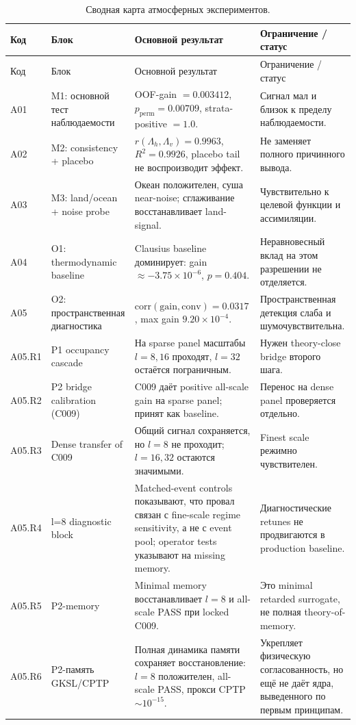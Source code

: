 \documentclass[11pt,a4paper]{article}
\theoremstyle{definition}
\theoremstyle{plain}
\theoremstyle{remark}
\begin{document}
{\small
\begin{longtable}{@{}p{1.3cm}p{3.3cm}p{5.0cm}p{3.6cm}@{}}
\caption{Сводная карта атмосферных экспериментов.}\label{tab:appendix_a_map}\\
\toprule
Код & Блок & Основной результат & Ограничение / статус \\
\midrule
\endfirsthead
\toprule
Код & Блок & Основной результат & Ограничение / статус \\
\midrule
\endhead
A01 & M1: основной тест наблюдаемости & OOF-gain $=0.003412$, $p_{\mathrm{perm}}=0.00709$, strata-positive $=1.0$. & Сигнал мал и близок к пределу наблюдаемости. \\
A02 & M2: consistency + placebo & $r(\Lambda_h,\Lambda_v)=0.9963$, $R^2=0.9926$, placebo tail не воспроизводит эффект. & Не заменяет полного причинного вывода. \\
A03 & M3: land/ocean + noise probe & Океан положителен, суша near-noise; сглаживание восстанавливает land-signal. & Чувствительно к целевой функции и ассимиляции. \\
A04 & O1: thermodynamic baseline & Clausius baseline доминирует: gain $\approx-3.75\times10^{-6}$, $p=0.404$. & Неравновесный вклад на этом разрешении не отделяется. \\
A05 & O2: пространственная диагностика & $\mathrm{corr}(\mathrm{gain},\mathrm{conv})=0.0317$, max gain $9.20\times10^{-4}$. & Пространственная детекция слаба и шумочувствительна. \\
A05.R1 & P1 occupancy cascade & На sparse panel масштабы $l=8,16$ проходят, $l=32$ остаётся пограничным. & Нужен theory-close bridge второго шага. \\
A05.R2 & P2 bridge calibration (C009) & C009 даёт positive all-scale gain на sparse panel; принят как baseline. & Перенос на dense panel проверяется отдельно. \\
A05.R3 & Dense transfer of C009 & Общий сигнал сохраняется, но $l=8$ не проходит; $l=16,32$ остаются значимыми. & Finest scale режимно чувствителен. \\
A05.R4 & l=8 diagnostic block & Matched-event controls показывают, что провал связан с fine-scale regime sensitivity, а не с event pool; operator tests указывают на missing memory. & Диагностические retunes не продвигаются в production baseline. \\
A05.R5 & P2-memory & Minimal memory восстанавливает $l=8$ и all-scale PASS при locked C009. & Это minimal retarded surrogate, не полная theory-of-memory. \\
A05.R6 & P2-память GKSL/CPTP & Полная динамика памяти сохраняет восстановление: $l=8$ положителен, all-scale PASS, прокси CPTP $\sim 10^{-15}$. & Укрепляет физическую согласованность, но ещё не даёт ядра, выведенного по первым принципам. \\

\end{longtable}}
\end{document}
